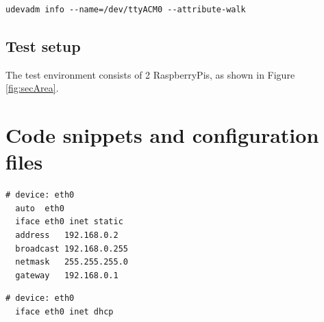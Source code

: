 \begin{lstlisting}[style=BashInputStyle,label=lst:udev]
  udevadm info --name=/dev/ttyACM0 --attribute-walk
\end{lstlisting}

\section{Test setup}

The test environment consists of 2 RaspberryPis, as shown in Figure \ref{fig:secArea}. 

\chapter{Code snippets and configuration files}

\begin{lstlisting}[style=BashInputStyle,caption={Raspbian configuration for static \gls{ip} address},label=lst:staticIP]
# device: eth0
  auto  eth0
  iface eth0 inet static
  address   192.168.0.2
  broadcast 192.168.0.255
  netmask   255.255.255.0
  gateway   192.168.0.1
\end{lstlisting}

\begin{lstlisting}[style=BashInputStyle,caption={Raspbian configuration for dynamic \gls{ip} address},label=lst:dynamicIP]
# device: eth0
  iface eth0 inet dhcp
\end{lstlisting}





